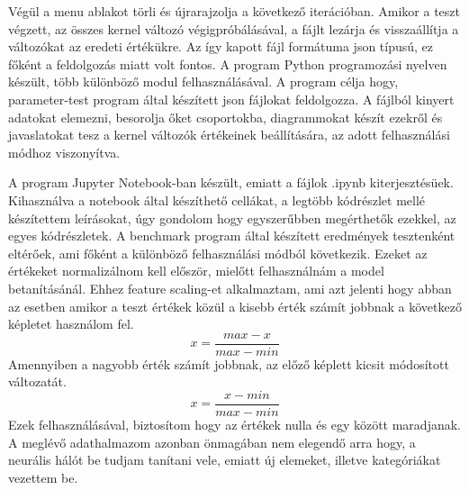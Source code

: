 Végül a menu ablakot törli és újrarajzolja a következő iterációban.
Amikor a teszt végzett, az összes kernel változó végigpróbálásával, a fájlt lezárja és visszaállítja a változókat az eredeti értékükre.
Az így kapott fájl formátuma json típusú, ez főként a feldolgozás miatt volt fontos.
A program Python programozási nyelven készült, több különböző modul felhasználásával.
 A program célja hogy, parameter-test program által készített json fájlokat feldolgozza. A fájlból kinyert adatokat elemezni, besorolja őket csoportokba, diagrammokat készít ezekről és javaslatokat tesz a kernel változók értékeinek beállítására, az adott felhasználási módhoz viszonyítva.

A program Jupyter Notebook-ban készült, emiatt a fájlok .ipynb kiterjesztésüek. Kihasználva a notebook által készíthető cellákat, a legtöbb kódrészlet mellé készítettem leírásokat, úgy gondolom hogy egyszerűbben megérthetők ezekkel, az egyes kódrészletek.
A benchmark program által készített eredmények tesztenként eltérőek, ami főként a különböző felhasználási módból következik. Ezeket az értékeket normalizálnom kell először, mielőtt felhasználnám a model betanításánál. Ehhez feature scaling-et alkalmaztam, ami azt jelenti hogy abban az esetben amikor a teszt értékek közül a kisebb érték számít jobbnak a következő képletet használom fel. 
\begin{equation}
x = \frac{max-x}{max-min}
\end{equation}
Amennyiben a nagyobb érték számít jobbnak, az előző képlett kicsit módosított változatát.
\begin{equation}
x = \frac{x-min}{max-min}
\end{equation}
Ezek felhasználásával, biztosítom hogy az értékek nulla és egy között maradjanak.
A meglévő adathalmazom azonban önmagában nem elegendő arra hogy, a neurális hálót be tudjam tanítani vele, emiatt új elemeket, illetve kategóriákat vezettem be.
